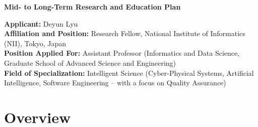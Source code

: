 \documentclass[12pt,a4paper]{article}
\begin{document}
\begin{center}
    \Large \textbf{Mid- to Long-Term Research and Education Plan}
\end{center}


\noindent \textbf{Applicant:} Deyun Lyu \\
\textbf{Affiliation and Position:} Research Fellow, National Institute of Informatics (NII), Tokyo, Japan\\
\textbf{Position Applied For:} Assistant Professor (Informatics and Data Science, Graduate School of Advanced Science and Engineering)\\
\textbf{Field of Specialization:} Intelligent Science (Cyber-Physical Systems, Artificial Intelligence, Software Engineering – with a focus on Quality Assurance)

\section{Overview}
\end{document}
